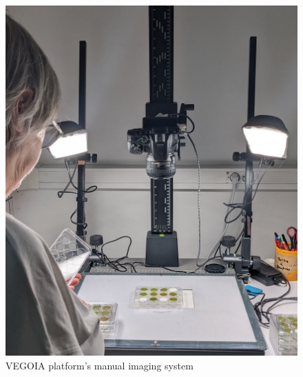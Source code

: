 \documentclass[english]{article}
\begin{document}

\begin{figure}[H]
    \begin{center}
        \includegraphics[width=0.5\linewidth]{2023_a_oiv_imaging_system.jpg}
        \caption{VEGOIA platform's manual imaging system}\label{fig:vegoia}
    \end{center}
\end{figure}
\end{document}
